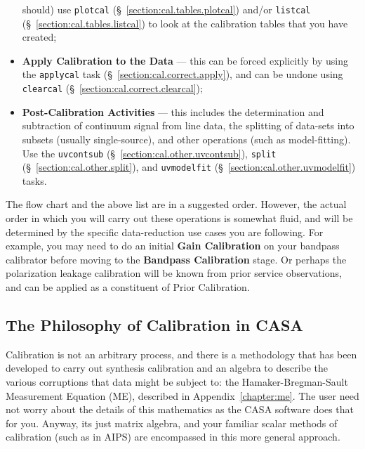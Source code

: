 \begin{itemize}
      should) use {\tt plotcal} (\S~\ref{section:cal.tables.plotcal}) 
      and/or {\tt listcal} (\S~\ref{section:cal.tables.listcal})
      to look at the calibration tables that you have created;
   \item {\bf Apply Calibration to the Data} --- this can be forced
      explicitly by using the {\tt applycal} task
      (\S~\ref{section:cal.correct.apply}), and can be undone using
      {\tt clearcal} (\S~\ref{section:cal.correct.clearcal});
   \item {\bf Post-Calibration Activities} --- this includes the
      determination and subtraction of continuum signal from line
      data, the splitting of data-sets into subsets (usually
      single-source), and other operations (such as model-fitting).
      Use the {\tt uvcontsub} (\S~\ref{section:cal.other.uvcontsub}),
      {\tt split} (\S~\ref{section:cal.other.split}),
      and {\tt uvmodelfit} (\S~\ref{section:cal.other.uvmodelfit})
      tasks.
\end{itemize}

The flow chart and the above list are in a suggested order.  However,
the actual order in which you will carry out these operations is
somewhat fluid, and will be determined by the specific data-reduction
use cases you are following.  For example, you may need to do an
initial {\bf Gain Calibration} on your bandpass calibrator before
moving to the {\bf Bandpass Calibration} stage.  Or perhaps the
polarization leakage calibration will be known from prior service 
observations, and can be applied as a constituent of Prior Calibration.

\subsection{The Philosophy of Calibration in CASA}
\label{section:cal.flow.philo}

Calibration is not an arbitrary process, and there is
a methodology that has been developed to carry out synthesis
calibration and an algebra to describe the various corruptions
that data might be subject to: the Hamaker-Bregman-Sault Measurement
Equation (ME), described in Appendix~\ref{chapter:me}.
The user need not worry about the details of this mathematics
as the CASA software does that for you.  Anyway, its just
matrix algebra, and your familiar scalar methods of calibration
(such as in AIPS) are encompassed in this more general approach.

